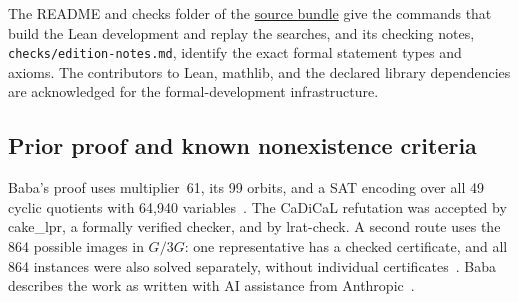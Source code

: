 \documentclass[11pt]{article}
\begin{document}
The README and checks folder of the
\href{https://github.com/6/clank-lab/tree/difference-set-243-v5/results/difference-set-243}{source bundle}
give the commands that build the Lean development and replay the
searches, and its checking notes, \texttt{checks/edition-notes.md},
identify the exact formal statement types and axioms. The contributors
to Lean, mathlib, and the declared library dependencies are acknowledged
for the formal-development infrastructure.

\begin{appendices}

\section{Prior proof and known nonexistence criteria}\label{sec:context}

Baba's proof uses multiplier~61, its 99 orbits, and a SAT encoding over
all 49 cyclic quotients with 64,940 variables~\cite[Steps~1--5 and~8(a); VERIFY, Section~5]{Baba2026}.
The CaDiCaL refutation was accepted by cake\_lpr, a formally verified
checker, and by lrat-check. A second route uses the 864 possible images
in $G/3G$: one representative has a checked certificate, and all 864
instances were also solved separately, without individual
certificates~\cite[Steps~6--8 and VERIFY, Sections~3--4]{Baba2026}.
Baba describes the work as written with AI assistance from
Anthropic~\cite[repository README, Caveats]{Baba2026}.


\end{appendices}
\end{document}
